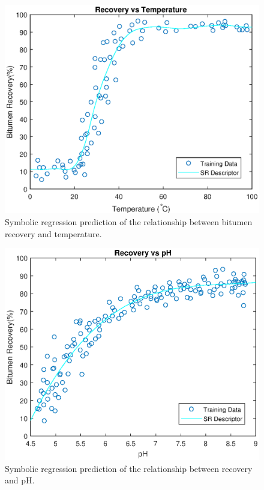 \documentclass[final,5p,times,twocolumn]{elsarticle}
\begin{document}
\begin{figure}[!hptb]
	\centering
	\includegraphics[width=\linewidth,clip]{T_SR.eps}
	\vspace{-2em}
	\caption{Symbolic regression prediction of the relationship between bitumen recovery and temperature.}
	\label{fig:T_SR}
\end{figure}





\begin{figure}[!hptb]
	\centering
	\includegraphics[width=\linewidth,clip]{pH_SR.eps}
	\vspace{-2em}
	\caption{Symbolic regression prediction of the relationship between recovery and pH.}
	\label{fig:pH_SR}
\end{figure}
\end{document}
